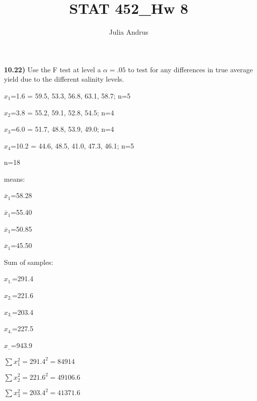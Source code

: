 \documentclass{article}
\title{STAT 452\_Hw 8}
\author{Julia Andrus}
\date{}
\begin{document}
\maketitle 


\textbf{10.22)} Use the F test at level a $\alpha=.05$ to test for any differences in true average yield due to the different salinity levels.


\vspace{2mm}


$x_{1}$=1.6 = 59.5, 53.3, 56.8, 63.1, 58.7;  n=5

\vspace{2mm}

$x_{2}$=3.8 = 55.2, 59.1, 52.8, 54.5;  n=4

\vspace{2mm}

$x_{3}$=6.0 = 51.7, 48.8, 53.9, 49.0;  n=4

\vspace{2mm}

$x_{4}$=10.2 = 44.6, 48.5, 41.0, 47.3, 46.1;  n=5

\vspace{2mm}

n=18

\vspace{2mm}



\vspace{4mm}

means:

$\overline{x}_{1}$=58.28

$\overline{x}_{1}$=55.40

$\overline{x}_{1}$=50.85

$\overline{x}_{1}$=45.50

\vspace{4mm}

Sum of samples:

$x_{1.}$=291.4

$x_{2.}$=221.6

$x_{3.}$=203.4

$x_{4.}$=227.5

$x_{..}$=943.9


$\sum x^{2}_{1}=291.4^{2}=84914$

$\sum x^{2}_{2}=221.6^{2}=49106.6$

$\sum x^{2}_{3}=203.4^{2}=41371.6$
\end{document}
